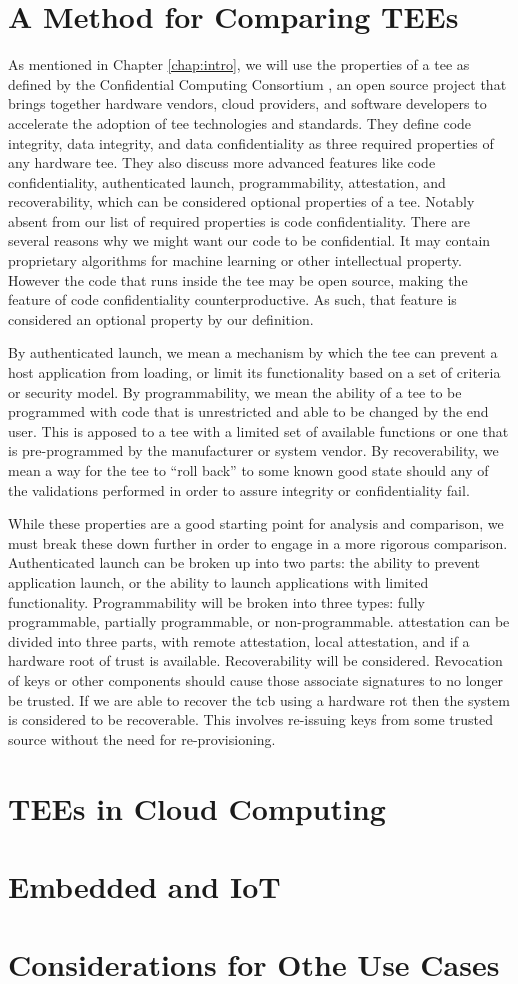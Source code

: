 \section{A Method for Comparing TEEs}
As mentioned in Chapter \ref{chap:intro}, we will use the properties of a \gls{tee} as defined by the Confidential Computing Consortium \cite{cccTAC}, an open source project that brings together hardware vendors, cloud providers, and software developers to accelerate the adoption of \gls{tee} technologies and standards. They define code integrity, data integrity, and data confidentiality as three required properties of any hardware \gls{tee}. They also discuss more advanced features like code confidentiality, authenticated launch, programmability, \gls{attestation}, and recoverability, which can be considered optional properties of a \gls{tee}. Notably absent from our list of required properties is code confidentiality. There are several reasons why we might want our code to be confidential. It may contain proprietary algorithms for machine learning or other intellectual property. However the code that runs inside the \gls{tee} may be open source, making the feature of code confidentiality counterproductive. As such, that feature is considered an optional property by our definition.

By authenticated launch, we mean a mechanism by which the \gls{tee} can prevent a host application from loading, or limit its functionality based on a set of criteria or security model. By programmability, we mean the ability of a \gls{tee} to be programmed with code that is unrestricted and able to be changed by the end user. This is apposed to a \gls{tee} with a limited set of available functions or one that is pre-programmed by the manufacturer or system vendor. By recoverability, we mean a way for the \gls{tee} to ``roll back'' to some known good state should any of the validations performed in order to assure integrity or confidentiality fail.

While these properties are a good starting point for analysis and comparison, we must break these down further in order to engage in a more rigorous comparison. Authenticated launch can be broken up into two parts: the ability to prevent application launch, or the ability to launch applications with limited functionality. Programmability will be broken into three types: fully programmable, partially programmable, or non-programmable. \Gls{attestation} can be divided into three parts, with remote attestation, local attestation, and if a hardware root of trust is available. Recoverability will be considered. Revocation of keys or other components should cause those associate signatures to no longer be trusted. If we are able to recover the \gls{tcb} using a hardware \gls{rot} then the system is considered to be recoverable. This involves re-issuing keys from some trusted source without the need for re-provisioning.

\renewcommand{\arraystretch}{1}


\section{TEEs in Cloud Computing}
\section{Embedded and IoT}
\section{Considerations for Othe Use Cases}
